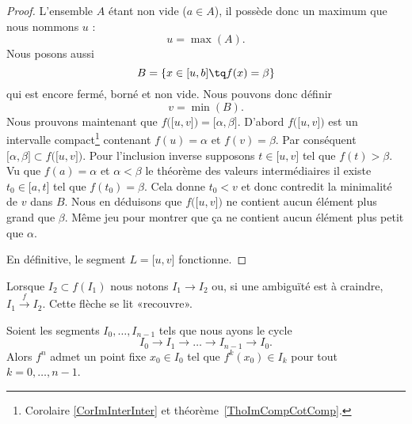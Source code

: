 \begin{proof}
    L'ensemble \( A\) étant non vide (\( a\in A\)), il possède donc un maximum que nous nommons \( u\) :
    \begin{equation}
        u=\max(A).
    \end{equation}
    Nous posons aussi
    \begin{equation}
        B=\{ x\in \mathopen[ u , b \mathclose]\tq f(x)=\beta \}
    \end{equation}
    qui est encore fermé, borné et non vide. Nous pouvons donc définir
    \begin{equation}
        v=\min(B).
    \end{equation}
    Nous prouvons maintenant que \( f\big( \mathopen[ u , v \mathclose] \big)=\mathopen[ \alpha , \beta \mathclose]\). D'abord \( f\big( \mathopen[ u , v \mathclose] \big)\) est un intervalle compact\footnote{Corolaire \ref{CorImInterInter} et théorème~\ref{ThoImCompCotComp}.} contenant \( f(u)=\alpha\) et \( f(v)=\beta\). Par conséquent \( \mathopen[ \alpha , \beta \mathclose]\subset f\big( \mathopen[ u , v \mathclose] \big)\). Pour l'inclusion inverse supposons \( t\in \mathopen[ u , v \mathclose]\) tel que \( f(t)>\beta\). Vu que \( f(a)=\alpha\) et \( \alpha<\beta\) le théorème des valeurs intermédiaires il existe \( t_0\in \mathopen[ a , t \mathclose]\) tel que \( f(t_0)=\beta\). Cela donne \( t_0<v\) et donc contredit la minimalité de \( v\) dans \( B\). Nous en déduisons que \( f\big( \mathopen[ u , v \mathclose] \big)\) ne contient aucun élément plus grand que \( \beta\). Même jeu pour montrer que ça ne contient aucun élément plus petit que \( \alpha\).

    En définitive, le segment \( L=\mathopen[ u , v \mathclose]\) fonctionne.
\end{proof}

Lorsque \( I_2\subset f(I_1)\) nous notons \( I_1\to I_2\) ou, si une ambiguïté est à craindre, \( I_1\stackrel{f}{\longrightarrow}I_2\). Cette flèche se lit «recouvre».
\begin{lemma}      \label{LemSSPXooMkwzjb}
    Soient les segments \( I_0,\ldots, I_{n-1}\) tels que nous ayons le cycle
    \begin{equation}
        I_0\to I_1\to\ldots\to I_{n-1}\to I_0.
    \end{equation}
    Alors \( f^n\) admet un point fixe \( x_0\in I_0\) tel que \( f^k(x_0)\in I_k\) pour tout \( k=0,\ldots, n-1\).
\end{lemma}

